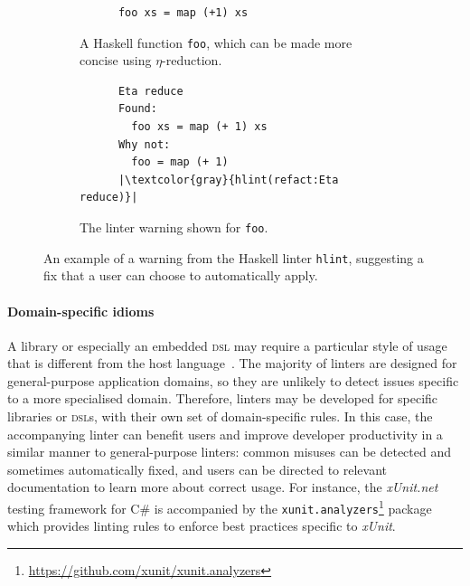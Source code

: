\documentclass[../../main.tex]{subfiles}
\begin{document}
\begin{figure}[htbp]
  \vspace{3ex}
  \centering
  \begin{subfigure}{0.45\textwidth}
    \centering
    \begin{verbatim}
      foo xs = map (+1) xs
    \end{verbatim}
    \caption{A Haskell function \texttt{foo}, which can be made more concise using $\eta$-reduction.}
  \end{subfigure}
  \hfill
  \begin{subfigure}{0.45\textwidth}
    \centering
    \begin{verbatim}
      Eta reduce
      Found:
        foo xs = map (+ 1) xs
      Why not:
        foo = map (+ 1)
      |\textcolor{gray}{hlint(refact:Eta reduce)}|
    \end{verbatim}
    \caption{The linter warning shown for \texttt{foo}.}
  \end{subfigure}
  \caption{An example of a warning from the Haskell linter \texttt{hlint}, suggesting a fix that a user can choose to automatically apply.}
  \label{fig:hlint-example}
\end{figure}

\paragraph{Domain-specific idioms}
A library or especially an embedded \textsc{dsl} may require a particular style of usage that is different from the host language~\cite{hora_domain_2012}.
The majority of linters are designed for general-purpose application domains, so they are unlikely to detect issues specific to a more specialised domain.
Therefore, linters may be developed for specific libraries or \textsc{dsl}s, with their own set of domain-specific rules.
In this case, the accompanying linter can benefit users and improve developer productivity in a similar manner to general-purpose linters: common misuses can be detected and sometimes automatically fixed, and users can be directed to relevant documentation to learn more about correct usage.
For instance, the \emph{xUnit.net} testing framework for C\# is accompanied by the \texttt{xunit.analyzers}\footnote{\url{https://github.com/xunit/xunit.analyzers}} package which provides linting rules to enforce best practices specific to \emph{xUnit}.
\end{document}
